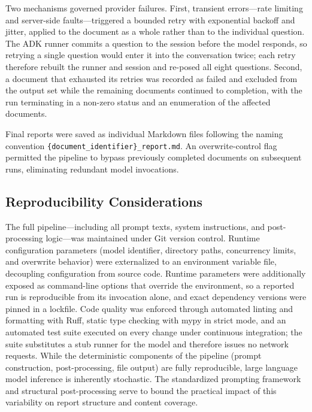 \documentclass[12pt, a4paper]{article}
\begin{document}
\noindent Two mechanisms governed provider failures. First, transient errors---rate limiting and server-side faults---triggered a bounded retry with exponential backoff and jitter, applied to the document as a whole rather than to the individual question. The ADK runner commits a question to the session before the model responds, so retrying a single question would enter it into the conversation twice; each retry therefore rebuilt the runner and session and re-posed all eight questions. Second, a document that exhausted its retries was recorded as failed and excluded from the output set while the remaining documents continued to completion, with the run terminating in a non-zero status and an enumeration of the affected documents.

Final reports were saved as individual Markdown files following the naming convention \texttt{\{document\_identifier\}\_report.md}. An overwrite-control flag permitted the pipeline to bypass previously completed documents on subsequent runs, eliminating redundant model invocations.

\subsection*{Reproducibility Considerations}

The full pipeline---including all prompt texts, system instructions, and post-processing logic---was maintained under Git version control. Runtime configuration parameters (model identifier, directory paths, concurrency limits, and overwrite behavior) were externalized to an environment variable file, decoupling configuration from source code. Runtime parameters were additionally exposed as command-line options that override the environment, so a reported run is reproducible from its invocation alone, and exact dependency versions were pinned in a lockfile. Code quality was enforced through automated linting and formatting with Ruff, static type checking with mypy in strict mode, and an automated test suite executed on every change under continuous integration; the suite substitutes a stub runner for the model and therefore issues no network requests. While the deterministic components of the pipeline (prompt construction, post-processing, file output) are fully reproducible, large language model inference is inherently stochastic. The standardized prompting framework and structural post-processing serve to bound the practical impact of this variability on report structure and content coverage.
\end{document}
